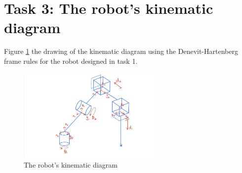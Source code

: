 \section{Task 3: The robot's kinematic diagram}
\FloatBarrier %

Figure \ref{F 4.1} the drawing of the kinematic diagram using the Denevit-Hartenberg frame rules for the robot designed in task 1.

\begin{figure}[htbp]
    \centering
    \includegraphics[width=7cm]{./fig/D-H.jpg}
    \caption{The robot's kinematic diagram}
    \label{F 4.1}
\end{figure}

